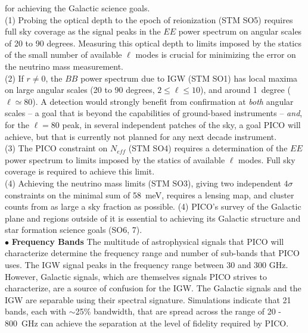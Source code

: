 \documentclass[PICOReport.tex]{subfiles}
\begin{document}
for achieving the Galactic science goals. \\
(1) Probing the optical depth to the epoch of reionization (STM SO5) requires full sky 
coverage as the signal peaks in the $EE$ power spectrum on angular scales of 20 to 90 degrees. Measuring 
this optical depth to limits imposed by the statics of the small number of available $\ell$ modes is crucial 
for minimizing the error on the neutrino mass measurement. \\   
(2) If $r \ne 0 $, the $BB$ power spectrum due to IGW (STM SO1) has local maxima on large angular scales
(20 to 90 degrees, $ 2 \leq \ell \leq 10$), and around 1~degree ($ \ell \simeq 80$). 
A detection would strongly benefit from confirmation at {\it both} angular 
scales -- a goal that is beyond the capabilities of ground-based instruments -- {\it and}, for the $\ell = 80$ peak, 
in several independent patches of the sky, a goal PICO will achieve, but that is currently not planned for any next decade instrument.  \\
(3) The PICO constraint on $N_{eff}$ (STM SO4) requires a determination of the $EE$ power spectrum to limits
imposed by the statics of available $\ell$ modes. Full sky coverage is required to achieve this limit.  \\
(4) Achieving the neutrino mass limits (STM SO3), giving two independent $4\sigma$ constraints on the minimal sum of 58~meV, requires
a lensing map, and cluster counts from as large a sky fraction as possible. 
(4) PICO's survey of the Galactic plane and regions outside of it is essential to achieving its Galactic structure 
and star formation science goals (SO6, 7). \\
%
$\bullet$ {\bf Frequency Bands} \hspace{0.1in} The multitude of astrophysical signals that PICO will characterize 
determine the frequency range and number of sub-bands that PICO uses. The IGW signal peaks 
in the frequency range between 30 and 300 GHz. However, Galactic signals, which are themselves signals PICO strives to 
characterize, are a source of confusion for the IGW. The Galactic signals and the IGW are separable using their 
spectral signature. Simulations indicate that 21 bands, each with $\sim$25\% bandwidth, that are spread across 
the range of 20 - 800~GHz can achieve the separation at the level of fidelity required by PICO. 
\end{document}
